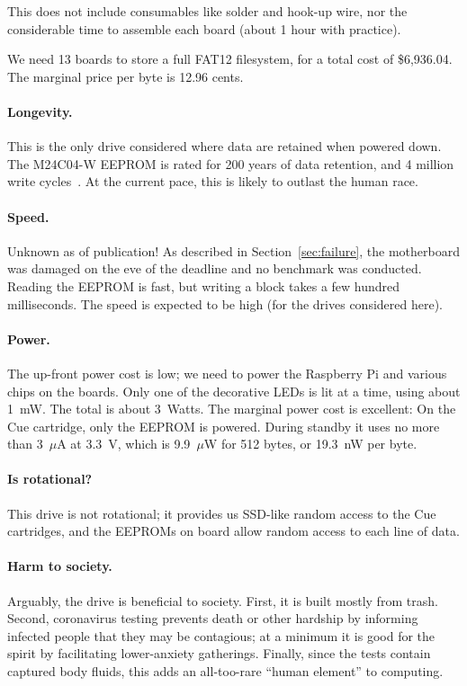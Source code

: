 \documentclass[twocolumn]{article}
\begin{document}
This does not include consumables like solder and hook-up wire, nor the
considerable time to assemble each board (about 1 hour with practice).

We need 13 boards to store a full FAT12 filesystem, for a total cost
of \$6,936.04. The marginal price per byte is 12.96 cents.

\paragraph{Longevity.} This is the only drive considered where data
are retained when powered down. The M24C04-W EEPROM is rated for 200
years of data retention, and 4 million write cycles~\cite{stm24c0w}.
At the current pace, this is likely to outlast the human race.

\paragraph{Speed.} Unknown as of publication! As described in
Section~\ref{sec:failure}, the motherboard was damaged on the eve of
the deadline and no benchmark was conducted. Reading the EEPROM is
fast, but writing a block takes a few hundred milliseconds. The speed
is expected to be high (for the drives considered here).

\paragraph{Power.} The up-front power cost is low; we need to power
the Raspberry Pi and various chips on the boards. Only one of the
decorative LEDs is lit at a time, using about 1~mW. The total is about
3~Watts. %
The marginal power cost is excellent: On the Cue cartridge,
only the EEPROM is powered. During standby it uses no more than
3~$\mu$A at 3.3~V, which is 9.9~$\mu$W for 512 bytes, or 19.3~nW per
byte.

\paragraph{Is rotational?} This drive is not rotational; it provides
us SSD-like random access to the Cue cartridges, and the EEPROMs on
board allow random access to each line of data.

\paragraph{Harm to society.} Arguably, the drive is beneficial to
society. First, it is built mostly from trash. Second, coronavirus
testing prevents death or other hardship by informing infected people
that they may be contagious; at a minimum it is good for the spirit by
facilitating lower-anxiety gatherings. Finally, since the tests
contain captured body fluids, this adds an all-too-rare ``human
element'' to computing.
\end{document}
